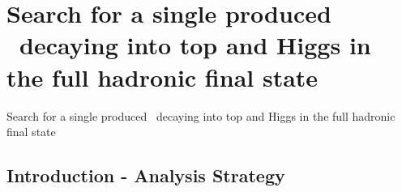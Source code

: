 \section[Analysis]{Search for a single produced \Tp~decaying into top and Higgs in the full hadronic final state}
\setcounter{tocdepth}{2}

\begin{frame}
\begin{center}
Search for a single produced \Tp~decaying into top and Higgs in the full hadronic final state
\end{center}
\end{frame}


\subsection{Introduction - Analysis Strategy}
